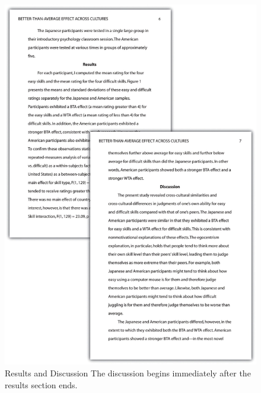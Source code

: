 \begin{figure}


\includegraphics[width=\linewidth]{figures/114}


\caption{Results and Discussion The discussion begins immediately after the results section ends.}


\label{fig:p3}
\end{figure}

